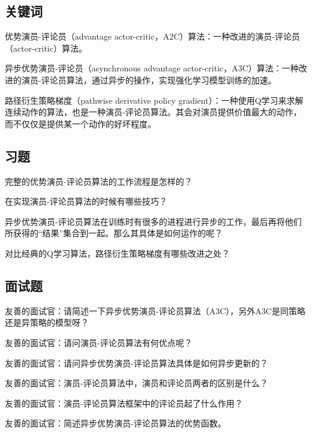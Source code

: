\subsection{关键词}

优势演员-评论员（advantage actor-critic，A2C）算法：一种改进的演员-评论员（actor-critic）算法。

异步优势演员-评论员（asynchronous advantage actor-critic，A3C）算法：一种改进的演员-评论员算法，通过异步的操作，实现强化学习模型训练的加速。

路径衍生策略梯度（pathwise derivative policy gradient）：一种使用Q学习来求解连续动作的算法，也是一种演员-评论员算法。其会对演员提供价值最大的动作，而不仅仅是提供某一个动作的好坏程度。


\subsection{习题}

 完整的优势演员-评论员算法的工作流程是怎样的？

 在实现演员-评论员算法的时候有哪些技巧？

 异步优势演员-评论员算法在训练时有很多的进程进行异步的工作，最后再将他们所获得的“结果”集合到一起。那么其具体是如何运作的呢？

 对比经典的Q学习算法，路径衍生策略梯度有哪些改进之处？

 
\subsection{面试题}

 友善的面试官：请简述一下异步优势演员-评论员算法（A3C），另外A3C是同策略还是异策略的模型呀？

 友善的面试官：请问演员-评论员算法有何优点呢？

 友善的面试官：请问异步优势演员-评论员算法具体是如何异步更新的？

 友善的面试官：演员-评论员算法中，演员和评论员两者的区别是什么？

 友善的面试官：演员-评论员算法框架中的评论员起了什么作用？

 友善的面试官：简述异步优势演员-评论员算法的优势函数。
  
